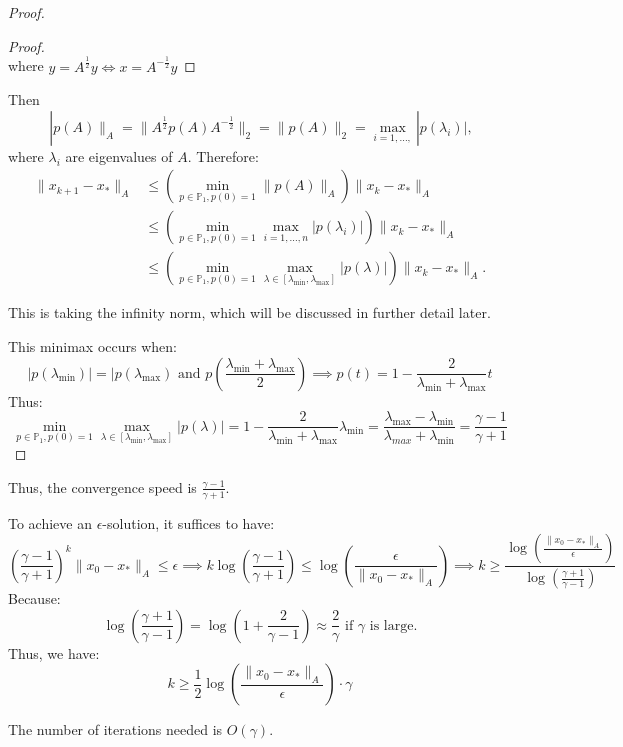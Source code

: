\documentclass[../main/main.tex]{subfiles}
\begin{document}
\begin{proof}
\begin{proof}
\[    \] where $y=A^{\frac{1}{2}}y \iff x = A^{-\frac{1}{2}}y$
  \end{proof}
  Then \[\ |p(A)\|_{A} = \|A^{\frac{1}{2}}p(A)A^{-\frac{1}{2}}\|_{2}= \|p(A)\|_{2} = \max _{i=1, \ldots  ,}|p(\lambda_{i})|,
  \] where $\lambda _{i}$ are eigenvalues of $A$. Therefore:
  \begin{align*}
    \|x_{k+1}-x_{*}\|_{A} &\leq  \left(\min _{p\in \mathbb{P}_{1}, p(0)=1}\|p(A)\|_{A}\right)\|x_{k}-x_{*}\|_{A} \\
&\leq  \left(\min _{p\in \mathbb{P}_{1}, p(0)=1} \max_{i=1, \ldots ,n}|p(\lambda_{i})|\right)\|x_{k}-x_{*}\|_{A} \\
&\leq  \left(\min _{p\in \mathbb{P}_{1}, p(0)=1} \max_{\lambda \in [\lambda_{\min },\lambda_{\max }]}|p(\lambda)|\right)\|x_{k}-x_{*}\|_{A}
    .\end{align*}
  \begin{remark}
This is taking the infinity norm, which will be discussed in further detail later.
  \end{remark}
  This minimax occurs when: \[
    |p(\lambda_{\min })| = |p(\lambda_{\max }) \text{ and }p\left(\frac{\lambda _{\min }+\lambda _{\max }}{2} \right) \implies  p(t) = 1- \frac{2}{\lambda _{\min }+\lambda _{\max }}t
  \] Thus: \[
\min _{p\in \mathbb{P}_{1}, p(0)=1} \max_{\lambda \in [\lambda_{\min },\lambda_{\max }]}|p(\lambda)| = 1- \frac{2}{\lambda _{\min }+\lambda _{\max }}\lambda _{\min } = \frac{\lambda _{\max }- \lambda _{\min }}{\lambda _{max}+\lambda _{\min }} = \frac{\gamma -1}{\gamma +1}
  \]
  \end{proof}
  \begin{remark}
Thus, the convergence speed is $\frac{\gamma -1}{\gamma +1} $.
  \end{remark}
  To achieve an $\epsilon $-solution, it suffices to have: \[
    \left(\frac{\gamma -1}{\gamma +1} \right)^{k}\|x_{0}-x_{*}\|_{A}\leq \epsilon  \implies  k \log \left(\frac{\gamma -1}{\gamma +1} \right)\leq  \log \left(\frac{\epsilon }{\|x_{0}-x_{*}\|_{A}} \right) \implies k\geq \frac{\log\left(\frac{\|x_{0}-x_{*}\|_{A}}{\epsilon } \right)}{\log \left(\frac{\gamma +1}{\gamma -1} \right)}
  \]
  Because: \[
\log \left(\frac{\gamma +1}{\gamma -1} \right)= \log \left(1+\frac{2}{\gamma -1}\right)\approx \frac{2}{\gamma } \text{ if $\gamma $ is large}.
\]Thus, we have: \[
  k \geq   \frac{1}{2} \log \left( \frac{\|x_{0}-x_{*}\|_{A}}{\epsilon } \right) \cdot \gamma
\]
\begin{remark}
The number of iterations needed is $O(\gamma)$.
\end{remark}
\end{document}
